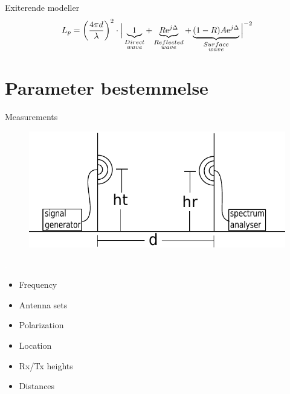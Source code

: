 \begin{frame}{Exiterende modeller}
\vspace{1em}
\begin{equation}
L_p=\left(\frac{4 \pi d}{\lambda}\right)^2 \cdot \Big|\underbrace{1}_{\begin{subarray}{c}Direct\\wave\end{subarray}}+\underbrace{R\text{e}^{j\Delta}}_{\begin{subarray}{c}Reflected\\wave\end{subarray}}+\underbrace{(1-R)A\text{e}^{j\Delta}}_{\begin{subarray}{c}Surface\\wave\end{subarray}}\Big|^{-2} 
\label{ground_wave}
\end{equation}
\end{frame}

\section{Parameter bestemmelse}
\begin{frame}{Measurements}
\begin{figure}[!htbp]
	\centering
	\includegraphics[width = 0.8\columnwidth]{figures/setup.pdf}
\end{figure}
\begin{minipage}{0.15\textwidth}
 \textcolor{white}{.}  
\end{minipage}%
\begin{minipage}{0.8\textwidth}
\begin{itemize}
\item Frequency
\item Antenna sets
\item Polarization
\item Location
\item Rx/Tx heights
\item Distances
\end{itemize}
\end{minipage}
\end{frame}



